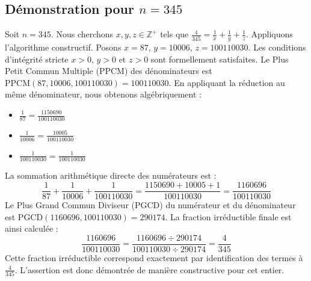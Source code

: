 \documentclass[11pt,a4paper]{article}
\begin{document}
\subsection{Démonstration pour $n = 345$}
Soit $n = 345$. Nous cherchons $x, y, z \in \mathbb{Z}^{+}$ tels que $\frac{4}{345} = \frac{1}{x} + \frac{1}{y} + \frac{1}{z}$.
Appliquons l'algorithme constructif. Posons $x = 87$, $y = 10006$, $z = 100110030$.
Les conditions d'intégrité stricte $x > 0$, $y > 0$ et $z > 0$ sont formellement satisfaites.
Le Plus Petit Commun Multiple (PPCM) des dénominateurs est $\text{PPCM}(87, 10006, 100110030) = 100110030$.
En appliquant la réduction au même dénominateur, nous obtenons algébriquement :
\begin{itemize}
    \item $\frac{1}{87} = \frac{1150690}{100110030}$
    \item $\frac{1}{10006} = \frac{10005}{100110030}$
    \item $\frac{1}{100110030} = \frac{1}{100110030}$
\end{itemize}
La sommation arithmétique directe des numérateurs est :
$$ \frac{1}{87} + \frac{1}{10006} + \frac{1}{100110030} = \frac{1150690 + 10005 + 1}{100110030} = \frac{1160696}{100110030} $$
Le Plus Grand Commun Diviseur (PGCD) du numérateur et du dénominateur est $\text{PGCD}(1160696, 100110030) = 290174$.
La fraction irréductible finale est ainsi calculée :
$$ \frac{1160696}{100110030} = \frac{1160696 \div 290174}{100110030 \div 290174} = \frac{4}{345} $$
Cette fraction irréductible correspond exactement par identification des termes à $\frac{4}{345}$. L'assertion est donc démontrée de manière constructive pour cet entier.
\end{document}
